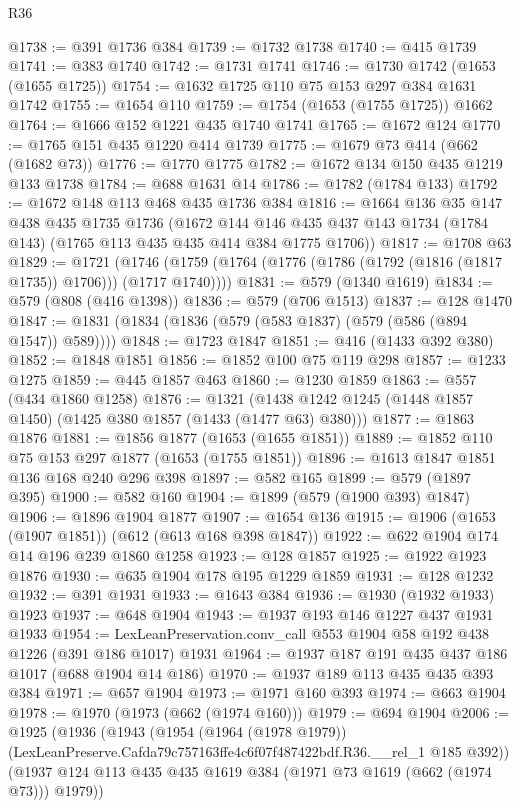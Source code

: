 \begin{lexlean}{R36}
\begin{coremodule}
@1738 := @391 @1736 @384
@1739 := @1732 @1738
@1740 := @415 @1739
@1741 := @383 @1740
@1742 := @1731 @1741
@1746 := @1730 @1742 (@1653 (@1655 @1725))
@1754 := @1632 @1725 @110 @75 @153 @297 @384 @1631 @1742
@1755 := @1654 @110
@1759 := @1754 (@1653 (@1755 @1725)) @1662
@1764 := @1666 @152 @1221 @435 @1740 @1741
@1765 := @1672 @124
@1770 := @1765 @151 @435 @1220 @414 @1739
@1775 := @1679 @73 @414 (@662 (@1682 @73))
@1776 := @1770 @1775
@1782 := @1672 @134 @150 @435 @1219 @133 @1738
@1784 := @688 @1631 @14
@1786 := @1782 (@1784 @133)
@1792 := @1672 @148 @113 @468 @435 @1736 @384
@1816 := @1664
    @136
    @35
    @147
    @438
    @435
    @1735
    @1736
    (@1672 @144 @146 @435 @437 @143 @1734 (@1784 @143) (@1765 @113 @435 @435 @414 @384 @1775 @1706))
@1817 := @1708 @63
@1829 := @1721
    (@1746 (@1759 (@1764 (@1776 (@1786 (@1792 (@1816 (@1817 @1735)) @1706))) (@1717 @1740))))
@1831 := @579 (@1340 @1619)
@1834 := @579 (@808 (@416 @1398))
@1836 := @579 (@706 @1513)
@1837 := @128 @1470
@1847 := @1831 (@1834 (@1836 (@579 (@583 @1837) (@579 (@586 (@894 @1547)) @589))))
@1848 := @1723 @1847
@1851 := @416 (@1433 @392 @380)
@1852 := @1848 @1851
@1856 := @1852 @100 @75 @119 @298
@1857 := @1233 @1275
@1859 := @445 @1857 @463
@1860 := @1230 @1859
@1863 := @557 (@434 @1860 @1258)
@1876 := @1321 (@1438 @1242 @1245 (@1448 @1857 @1450) (@1425 @380 @1857 (@1433 (@1477 @63) @380)))
@1877 := @1863 @1876
@1881 := @1856 @1877 (@1653 (@1655 @1851))
@1889 := @1852 @110 @75 @153 @297 @1877 (@1653 (@1755 @1851))
@1896 := @1613 @1847 @1851 @136 @168 @240 @296 @398
@1897 := @582 @165
@1899 := @579 (@1897 @395)
@1900 := @582 @160
@1904 := @1899 (@579 (@1900 @393) @1847)
@1906 := @1896 @1904 @1877
@1907 := @1654 @136
@1915 := @1906 (@1653 (@1907 @1851)) (@612 (@613 @168 @398 @1847))
@1922 := @622 @1904 @174 @14 @196 @239 @1860 @1258
@1923 := @128 @1857
@1925 := @1922 @1923 @1876
@1930 := @635 @1904 @178 @195 @1229 @1859
@1931 := @128 @1232
@1932 := @391 @1931
@1933 := @1643 @384
@1936 := @1930 (@1932 @1933) @1923
@1937 := @648 @1904
@1943 := @1937 @193 @146 @1227 @437 @1931 @1933
@1954 := LexLeanPreservation.conv_call @553 @1904 @58 @192 @438 @1226 (@391 @186 @1017) @1931
@1964 := @1937 @187 @191 @435 @437 @186 @1017 (@688 @1904 @14 @186)
@1970 := @1937 @189 @113 @435 @435 @393 @384
@1971 := @657 @1904
@1973 := @1971 @160 @393
@1974 := @663 @1904
@1978 := @1970 (@1973 (@662 (@1974 @160)))
@1979 := @694 @1904
@2006 := @1925
    (@1936
      (@1943
        (@1954
          (@1964 (@1978 @1979))
          (LexLeanPreserve.Cafda79c757163ffe4c6f07f487422bdf.R36.__rel_1 @185 @392))
        (@1937 @124 @113 @435 @435 @1619 @384 (@1971 @73 @1619 (@662 (@1974 @73))) @1979))

\end{coremodule}
\end{lexlean}
